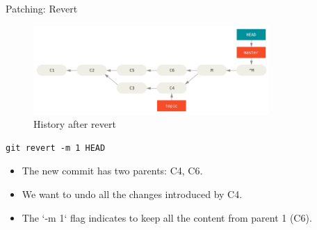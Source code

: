 \begin{frame}[fragile]{Patching: Revert}
  \begin{figure}
    \includegraphics[width=0.8\textwidth]{patching/undomerge-revert}
    \caption{History after revert}
  \end{figure}
  \begin{verbatim}
git revert -m 1 HEAD
  \end{verbatim}
  \begin{itemize}
    \footnotesize
    \item The new commit has two parents: C4, C6.
    \item We want to undo all the changes introduced by C4.
    \item The `-m 1` flag indicates to keep all the content from parent 1 (C6).
  \end{itemize}
\end{frame}
